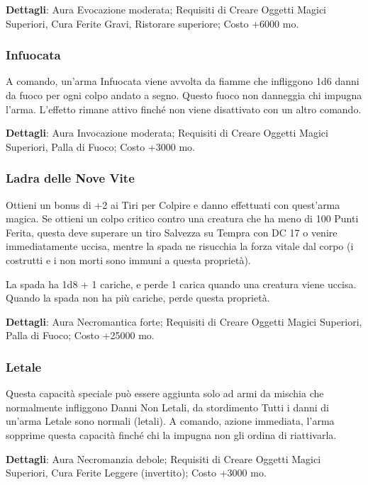 \begin{multicols}{2}
\textbf{Dettagli}: Aura Evocazione moderata; Requisiti di Creare Oggetti Magici Superiori, Cura Ferite Gravi, Ristorare superiore; Costo +6000 mo.

\subsubsection*{Infuocata}

A comando, un'arma Infuocata viene avvolta da fiamme che infliggono 1d6 danni da fuoco per ogni colpo andato a segno. Questo fuoco non danneggia chi impugna l'arma. L'effetto rimane attivo finché non viene disattivato con un altro comando.

\textbf{Dettagli}: Aura Invocazione moderata; Requisiti di Creare Oggetti Magici Superiori, Palla di Fuoco; Costo +3000 mo.

\subsubsection*{Ladra delle Nove Vite}

Ottieni un bonus di +2 ai Tiri per Colpire e danno effettuati con quest'arma magica. Se ottieni un colpo critico contro una creatura che ha meno di 100 Punti Ferita, questa deve superare un tiro Salvezza su Tempra con DC 17 o venire immediatamente uccisa, mentre la spada ne risucchia la forza vitale dal corpo (i costrutti e i non morti sono immuni a questa proprietà).

La spada ha 1d8 + 1 cariche, e perde 1 carica quando una creatura viene uccisa. Quando la spada non ha più cariche, perde questa proprietà.

\textbf{Dettagli}: Aura Necromantica forte; Requisiti di Creare Oggetti Magici Superiori, Palla di Fuoco; Costo +25000 mo.

\subsubsection*{Letale}

Questa capacità speciale può essere aggiunta solo ad armi da mischia che normalmente infliggono Danni Non Letali, da stordimento Tutti i danni di un'arma Letale sono normali (letali). A comando, azione immediata, l'arma sopprime questa capacità finché chi la impugna non gli ordina di riattivarla.

\textbf{Dettagli}: Aura Necromanzia debole; Requisiti di Creare Oggetti Magici Superiori, Cura Ferite Leggere (invertito); Costo +3000 mo.




\end{multicols}
